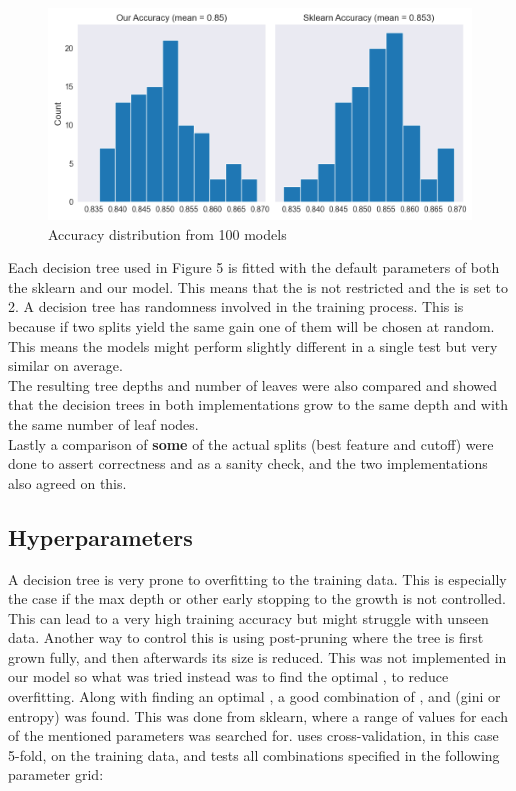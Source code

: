\begin{figure}[ht]
    \centering
    \includegraphics[scale=0.55]{figures_for_report/our_vs_sklearn_accuracy}
    \captionsetup{justification=centering,margin=2cm}
    \caption{Accuracy distribution from 100 models}
\end{figure}

Each decision tree used in Figure 5 is fitted with the default parameters of both the sklearn and our model.
This means that the  is not restricted and the  is set to 2.
A decision tree has randomness involved in the training process.
This is because if two splits yield the same gain one of them will be chosen at random.
This means the models might perform slightly different in a single test but very similar on average.\\

The resulting tree depths and number of leaves were also compared and showed that the decision trees in both implementations grow to the same
depth and with the same number of leaf nodes.
\\

Lastly a comparison of \textbf{some} of the actual splits (best feature and cutoff) were done to assert correctness and as a sanity check, and
the two implementations also agreed on this.\\

\subsection{Hyperparameters}
A decision tree is very prone to overfitting to the training data.
This is especially the case if the max depth or other early stopping to the growth is not controlled.
This can lead to a  very high training accuracy but might struggle with unseen data.
Another way to control this is using post-pruning where the tree is first grown fully, and then afterwards its size is reduced.
This was not implemented in our model so what was tried instead was to find the optimal , to reduce overfitting.
Along with finding an optimal , a good combination of ,  and
 (gini or entropy) was found.
This was done  from sklearn, where a range of values for each of the mentioned parameters was searched for.
 uses cross-validation, in this case 5-fold, on the training data, and tests all combinations specified in the following parameter grid:

